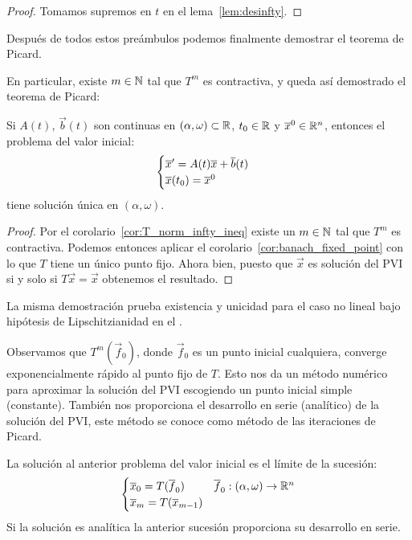 \documentclass[../ecuaciones_diferenciales.tex]{subfiles}
\begin{document}
\begin{proof}
	Tomamos supremos en \(t\) en el lema~\ref{lem:desinfty}.
\end{proof}

Después de todos estos preámbulos podemos finalmente demostrar el teorema de
Picard.

En particular, existe \(m \in \mathbb{N}\) tal que \(T^m\) es contractiva, y queda así
demostrado el teorema de Picard:

\begin{theorem}[Picard]
	Si \(A(t)\), \(\vec{b}(t)\) son continuas en 
	\((\alpha, \omega) \subset \mathbb{R}\), \(t_0 \in \mathbb{R}\) y \(\overline{x}^0 \in \mathbb{R}^n\), 
	entonces el problema del valor inicial:
	\[\begin{cases}
		\overline{x}' = A(t)\overline{x} + \overline{b}(t) \\
		\overline{x}(t_0) = \overline{x}^0\end{cases}\]
	tiene solución única en \((\alpha, \omega)\).
\end{theorem}

\begin{proof}
	Por el corolario~\ref{cor:T_norm_infty_ineq} existe un \(m \in \mathbb{N}\) tal que 
	\(T^m\) es contractiva. Podemos entonces aplicar el 
	corolario~\ref{cor:banach_fixed_point} con lo que \(T\) tiene un único 
	punto fijo. Ahora bien, puesto que \(\vec{x}\) es solución del
	PVI si y solo si \(T\vec{x} = \vec{x}\) obtenemos el resultado.
\end{proof}

\begin{remark}
	La misma demostración prueba existencia y unicidad para el caso no lineal bajo
	hipótesis de Lipschitzianidad en el .
\end{remark}

Observamos que \(T^m(\vec{f}_0)\), donde \(\vec{f}_0\) es un punto inicial 
cualquiera, converge exponencialmente rápido al punto fijo de \(T\). 
Esto nos da un método numérico para aproximar la solución del PVI escogiendo un 
punto inicial simple (constante). También nos proporciona el desarrollo en serie
(analítico) de la solución del PVI, este método se conoce como método de las 
iteraciones de Picard.

\begin{corollary}
	La solución al anterior problema del valor inicial es el límite de la 
	sucesión:
	\[\begin{cases}
		\overline{x}_0 = T(\overline{f}_0) & \overline{f}_0 : (\alpha, \omega) \to \mathbb{R}^n \\
		\overline{x}_m = T(\overline{x}_{m - 1})\end{cases}\]
	Si la solución es analítica la anterior sucesión proporciona su desarrollo
	en serie.
\end{corollary}
\end{document}
